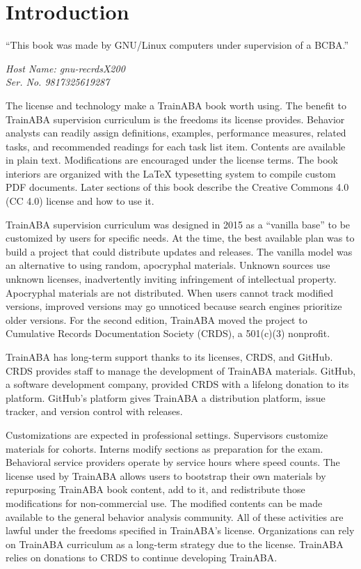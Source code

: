 %
%
%
\chapter{Introduction}
\epigraph{``This book was made by GNU/Linux computers under supervision of a BCBA.''}{\textit{Host Name: gnu-recrdsX200\\Ser. No. 9817325619287}}

The license and technology make a TrainABA book worth using. The benefit to TrainABA supervision curriculum is the freedoms its license provides. Behavior analysts can readily assign definitions, examples, performance measures, related tasks, and recommended readings for each task list item. Contents are available in plain text. Modifications are encouraged under the license terms. The book interiors are organized with the \LaTeX{} typesetting system to compile custom PDF documents. Later sections of this book describe the Creative Commons 4.0 (CC 4.0) license and how to use it. 

TrainABA supervision curriculum was designed in 2015 as a ``vanilla base''  to be customized by users for specific needs. At the time, the best available plan was to build a project that could distribute updates and releases. The vanilla model was an alternative to using random, apocryphal materials. Unknown sources use unknown licenses, inadvertently inviting infringement of intellectual property. Apocryphal materials are not distributed. When users cannot track modified versions, improved versions may go unnoticed because search engines prioritize older versions. For the second edition, TrainABA moved the project to Cumulative Records Documentation Society (CRDS), a 501(c)(3) nonprofit. 

TrainABA has long-term support thanks to its licenses, CRDS, and GitHub. CRDS provides staff to manage the development of TrainABA materials. GitHub, a software development company, provided CRDS with a lifelong donation to its platform. GitHub's platform gives TrainABA a distribution platform, issue tracker, and version control with releases.

Customizations are expected in professional settings. Supervisors customize materials for cohorts. Interns modify sections as preparation for the exam. Behavioral service providers operate by service hours where speed counts. The license used by TrainABA allows users to bootstrap their own materials by repurposing TrainABA book content, add to it, and redistribute those modifications for non-commercial use. The modified contents can be made available to the general behavior analysis community. All of these activities are lawful under the freedoms specified in TrainABA's license. Organizations can rely on TrainABA curriculum as a long-term strategy due to the license. TrainABA relies on donations to CRDS to continue developing TrainABA. 


